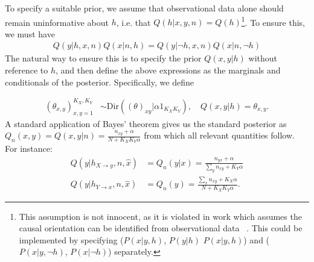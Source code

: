 \documentclass[letterpaper]{article} %
\begin{document}
To specify a suitable prior, we assume that observational data alone should remain uninformative about $h$, i.e. that $Q(h | x, y, n) = Q(h)$\footnote{This assumption is not innocent, as it is violated in work which assumes the causal orientation can be identified from observational data~ \cite{compton2021entropic}. This could be implemented by specifying ($P(x|y, h)$, $P(y|h)$ $P(x|y, h)$) and ($P(x|y, \neg h)$, $P(x|\neg h)$) separately.}. To ensure this, we must have
\begin{align}
Q(y | h, x, n)Q(x|n, h) = Q(y | \neg h, x, n)Q(x|n, \neg h) 
\end{align}
The natural way to ensure this is to specify the prior $Q(x,y|h)$ without reference to $h$, and then define the above expressions as the marginals and conditionals of the posterior. Specifically, we define

\begin{align*}
(\theta_{x,y} )_{x,y=1}^{K_X,K_Y} & \sim \textrm{Dir}( (\theta)_{xy} | \alpha 1_{K_X K_Y} ), \quad
Q(x,y | h)  = \theta_{x,y}.
\end{align*}
A standard application of Bayes' theorem gives us the standard posterior as $Q_n(x,y) = Q(x,y|n) = \frac{n_{xy}+\alpha}{ N + K_X K_Y\alpha  }$ from which all relevant quantities follow. For instance:
\begin{subequations}\label{eq:6}
\begin{align}
Q(y | h_{X \rightarrow y}, n, \hat x) & = Q_n(y|x) = \frac{ n_{yx} +\alpha }{ \sum_{y} n_{xy} + K_Y \alpha } \\ 
Q(y | h_{Y \rightarrow x}, n, \hat x) & = Q_n(y) = \frac{ \sum_{x} n_{xy} + K_X \alpha }{ N + K_X K_Y \alpha }.
\end{align}
\end{subequations}
	
\end{document}
